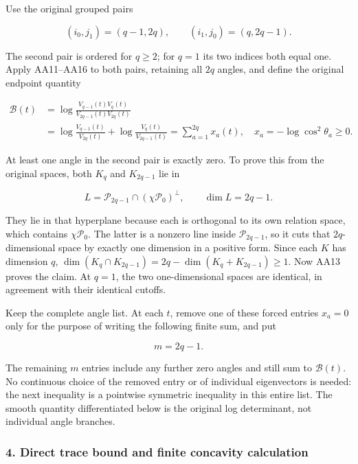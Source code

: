 Use the original grouped pairs

\[
(i_0,j_1)=(q-1,2q),\qquad
(i_1,j_0)=(q,2q-1).
\tag{AA17}
\]

The second pair is ordered for \(q\ge2\); for \(q=1\) its two indices both equal one. Apply AA11--AA16 to both pairs, retaining all \(2q\) angles, and define the original endpoint quantity

\[
\begin{aligned}
\mathcal B(t)
&=\log\frac{V_{q-1}(t)V_q(t)}{V_{2q-1}(t)V_{2q}(t)}\\
&=\log\frac{V_{q-1}(t)}{V_{2q}(t)}
 +\log\frac{V_q(t)}{V_{2q-1}(t)}
=\sum_{a=1}^{2q}x_a(t),\quad
x_a=-\log\cos^2\theta_a\ge0.
\end{aligned}
\tag{AA18}
\]

At least one angle in the second pair is exactly zero. To prove this from the original spaces, both \(K_q\) and \(K_{2q-1}\) lie in

\[
L=\mathcal P_{2q-1}\cap(\chi\mathcal P_0)^\perp,
\qquad\dim L=2q-1.
\tag{AA19}
\]

They lie in that hyperplane because each is orthogonal to its own relation space, which contains \(\chi\mathcal P_0\). The latter is a nonzero line inside \(\mathcal P_{2q-1}\), so it cuts that \(2q\)-dimensional space by exactly one dimension in a positive form. Since each \(K\) has dimension \(q\), \(\dim(K_q\cap K_{2q-1})=2q-\dim(K_q+K_{2q-1})\ge1\). Now AA13 proves the claim. At \(q=1\), the two one-dimensional spaces are identical, in agreement with their identical cutoffs.

Keep the complete angle list. At each \(t\), remove one of these forced entries \(x_a=0\) only for the purpose of writing the following finite sum, and put

\[
m=2q-1.
\tag{AA20}
\]

The remaining \(m\) entries include any further zero angles and still sum to \(\mathcal B(t)\). No continuous choice of the removed entry or of individual eigenvectors is needed: the next inequality is a pointwise symmetric inequality in this entire list. The smooth quantity differentiated below is the original log determinant, not individual angle branches.

\subsubsection{4. Direct trace bound and finite concavity calculation}\label{endpoint-all_degree_angle_review--direct-trace-bound-and-finite-concavity-calculation}

